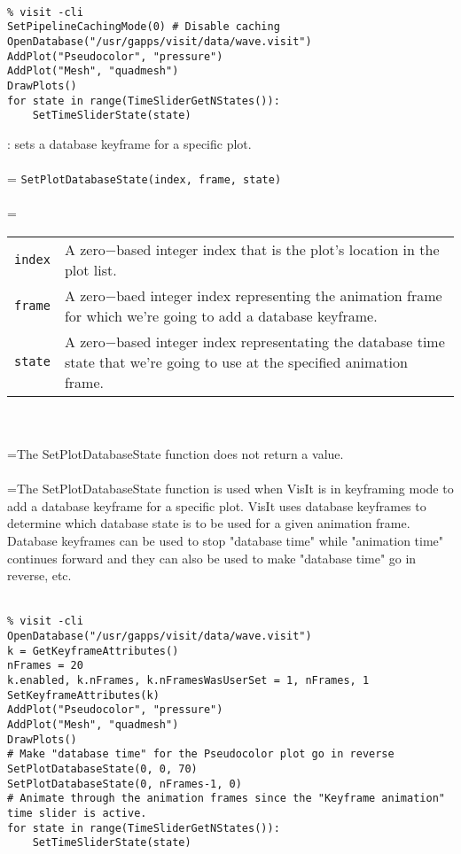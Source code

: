 \documentclass[10pt,a4paper]{report}
\begin{document}
\\[-6mm]
\begin{verbatim}% visit -cli
SetPipelineCachingMode(0) # Disable caching
OpenDatabase("/usr/gapps/visit/data/wave.visit")
AddPlot("Pseudocolor", "pressure")
AddPlot("Mesh", "quadmesh")
DrawPlots()
for state in range(TimeSliderGetNStates()):
    SetTimeSliderState(state)
\end{verbatim}
\newpage


{}
: sets a database keyframe for a specific plot.\\[-3mm]

 \\ 
\hangindent=\parindent 
\verb!SetPlotDatabaseState(index, frame, state)!\\ [-3mm]

 \\ 
\hangindent=\parindent 
\begin{tabular}{lp{9cm}}
\verb!index! & A zero$-$based integer index that is the plot's location in the plot list. \\
\verb!frame! & A zero$-$baed integer index representing the animation frame for which we're going to add a database keyframe. \\
\verb!state! & A zero$-$based integer index representating the database time state that we're going to use at the specified animation frame. \\
\end{tabular} \\[-2mm]


 \\ 
\hangindent=\parindent The SetPlotDatabaseState function does not return a value. \\[-3mm] 

 \\ 
\hangindent=\parindent The SetPlotDatabaseState function is used when VisIt is in keyframing mode to add a database keyframe for a specific plot. VisIt uses database keyframes to determine which database state is to be used for a given animation frame. Database keyframes can be used to stop "database time" while "animation time" continues forward and they can also be used to make "database time" go in reverse, etc. \\[-3mm] 

\\[-6mm]
\begin{verbatim}% visit -cli
OpenDatabase("/usr/gapps/visit/data/wave.visit")
k = GetKeyframeAttributes()
nFrames = 20
k.enabled, k.nFrames, k.nFramesWasUserSet = 1, nFrames, 1
SetKeyframeAttributes(k)
AddPlot("Pseudocolor", "pressure")
AddPlot("Mesh", "quadmesh")
DrawPlots()
# Make "database time" for the Pseudocolor plot go in reverse
SetPlotDatabaseState(0, 0, 70)
SetPlotDatabaseState(0, nFrames-1, 0)
# Animate through the animation frames since the "Keyframe animation"
time slider is active.
for state in range(TimeSliderGetNStates()):
    SetTimeSliderState(state)
\end{verbatim}
\newpage
\end{document}
